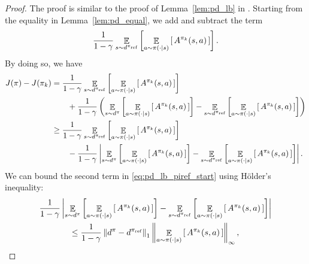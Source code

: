 \documentclass{article}
\begin{document}
\begin{proof}
The proof is similar to the proof of Lemma~\ref{lem:pd_lb} in \citet{achiam_2017}. Starting from the equality in Lemma~\ref{lem:pd_equal}, we add and subtract the term
\begin{equation}
\frac{1}{1-\gamma} \mathop{\mathbb{E}}_{s \sim d^{\pi_{\textnormal{ref}}}} \left[ \mathop{\mathbb{E}}_{a \sim \pi(\cdot \mid s)} \left[ \,  A^{\pi_k}(s,a) \, \right] \right].
\end{equation}
By doing so, we have
\begin{equation}\label{eq:pd_lb_piref_start}
\begin{split}
J(\pi) - J(\pi_k) &= \frac{1}{1-\gamma} \mathop{\mathbb{E}}_{s \sim d^{\pi_{\textnormal{ref}}}} \left[ \mathop{\mathbb{E}}_{a \sim \pi(\cdot \mid s)} \left[ \,  A^{\pi_k}(s,a) \, \right] \right] \\
& \qquad + \frac{1}{1-\gamma} \left(  \mathop{\mathbb{E}}_{s \sim d^{\pi}} \left[ \mathop{\mathbb{E}}_{a \sim \pi(\cdot \mid s)} \left[ \,  A^{\pi_k}(s,a) \, \right] \right] - \mathop{\mathbb{E}}_{s \sim d^{\pi_{\textnormal{ref}}}} \left[ \mathop{\mathbb{E}}_{a \sim \pi(\cdot \mid s)} \left[ \,  A^{\pi_k}(s,a) \, \right] \right] \right) \\
&\geq \frac{1}{1-\gamma} \mathop{\mathbb{E}}_{s \sim d^{\pi_{\textnormal{ref}}}} \left[ \mathop{\mathbb{E}}_{a \sim \pi(\cdot \mid s)} \left[ \,  A^{\pi_k}(s,a) \, \right] \right] \\
& \qquad - \frac{1}{1-\gamma} \left|  \mathop{\mathbb{E}}_{s \sim d^{\pi}} \left[ \mathop{\mathbb{E}}_{a \sim \pi(\cdot \mid s)} \left[ \,  A^{\pi_k}(s,a) \, \right] \right] - \mathop{\mathbb{E}}_{s \sim d^{\pi_{\textnormal{ref}}}} \left[ \mathop{\mathbb{E}}_{a \sim \pi(\cdot \mid s)} \left[ \,  A^{\pi_k}(s,a) \, \right] \right] \right|.
\end{split}
\end{equation}
We can bound the second term in \eqref{eq:pd_lb_piref_start} using H{\"o}lder's inequality:
\begin{multline}
\frac{1}{1-\gamma} \left|  \mathop{\mathbb{E}}_{s \sim d^{\pi}} \left[ \mathop{\mathbb{E}}_{a \sim \pi(\cdot \mid s)} \left[ \,  A^{\pi_k}(s,a) \, \right] \right] - \mathop{\mathbb{E}}_{s \sim d^{\pi_{\textnormal{ref}}}} \left[ \mathop{\mathbb{E}}_{a \sim \pi(\cdot \mid s)} \left[ \,  A^{\pi_k}(s,a) \, \right] \right] \right| \\ \leq \frac{1}{1-\gamma} \left\Vert d^{\pi} - d^{\pi_{\textnormal{ref}}} \right\Vert_1 \left\Vert \mathop{\mathbb{E}}_{a \sim \pi(\cdot \mid s)} \left[ \,  A^{\pi_k}(s,a) \, \right] \right\Vert_\infty,

\end{multline}
\end{proof}
\end{document}
